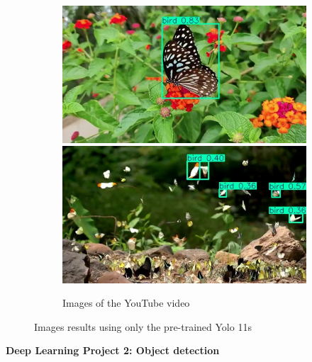 \documentclass{cpsc202}
\begin{document}
\begin{figure}
    \begin{subfigure}{.9\textwidth}
        \centering
        \includegraphics[width=.4\linewidth]{pretrained/photogram_16}
        \includegraphics[width=.4\linewidth]{pretrained/photogram_93}
        \caption{Images of the YouTube video}
        \label{fig:video-pretrainied}
    \end{subfigure}
    \caption{Images results using only the pre-trained Yolo 11s}
    \label{fig:pre-trained}
    \end{figure}

    \newpage
    \centerline{\Large\textbf{Deep Learning Project 2: Object detection}}
\end{document}

